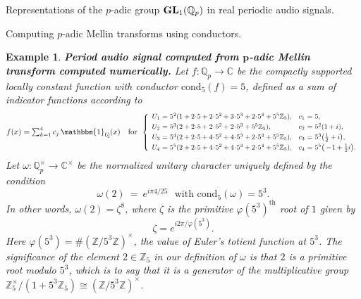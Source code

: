 \documentclass[letterpaper,11pt, reqno]{amsart}
\newtheorem{monodromy theorem}{Monodromy Theorem}[subsection]
\newtheorem{wild conjecture}[theorem]{Wild Conjecture}
\newtheorem{research objectives}{Research objectives}[subsection]
\newtheorem{research question}[theorem]{Research questions}
\newtheorem{aside question}[theorem]{Aside question}
\newtheorem{example}[theorem]{Example}
\newtheorem{audio example}[theorem]{\loudspeaker[3] Example}
\newtheorem{blank remark}[theorem]{}
\newtheorem{terminology and comment}[theorem]{Terminology and comment}
\newtheorem{purity hypothesis}[theorem]{Purity hypothesis}
\newtheorem{corollary of the purity hypothesis}[theorem]{Corollary of the purity hypothesis}
\newcommand{\CC} {{\mathbb C}}
\newcommand{\QQ} {{\mathbb Q}}
\newcommand{\ZZ} {{\mathbb Z}}
\newcommand{\lra}{{\longrightarrow}}
\numberwithin{equation}{theorem}
\begin{document}
\begin{section}{Representations of the $p$-adic group $\bold{GL}_{1}(\mathbb{Q}_{p})$
in real periodic audio signals.}
\begin{subsection}{Computing $p$-adic Mellin transforms using conductors.}
\begin{example}
{\bf Period audio signal computed from $\pmb{p}$-adic Mellin transform computed numerically.}
\normalfont
	Let $f:\QQ_p\lra\CC$ be the compactly supported locally constant function with conductor $\text{cond}_5(f)=5$, defined as a sum of indicator functions according to
	\begin{equation}\label{equation: cslc f for Mellin 01}
	\scalebox{.9}{$
	f(x)=\sum^{4}_{k=1}c_{j}\ \!\mathbbm{1}_{U_{\!j}\!}(x)
	\ \ \ \text{for}\ \ 
	\scalebox{.9}{$
	\left\{
	\begin{array}{rclcrcl}
	U_1
	&\!\!\!\!=\!\!\!\!&
	5^{2}(1+2\!\cdot\!5+2\!\cdot\!5^{2}+3\!\cdot\!5^3+2\!\cdot\!5^4+5^5\ZZ_{5}),
	&
	\!\!\!\!\!\!
	&
	c_1
	&\!\!\!\!=\!\!\!\!&
	5,
	\\[3pt]
	U_2
	&\!\!\!\!=\!\!\!\!&
	5^{3}(2+2\!\cdot\!5+2\!\cdot\!5^{2}+2\!\cdot\!5^3+5^5\ZZ_{5}),
	&
	\!\!\!\!\!\!
	&
	c_2
	&\!\!\!\!=\!\!\!\!&
	5^{2}(1+i),
	\\[3pt]
	U_3
	&\!\!\!\!=\!\!\!\!&
	5^{4}(2+2\!\cdot\!5+4\!\cdot\!5^{2}+4\!\cdot\!5^3+2\!\cdot\!5^4+5^5\ZZ_{5}),
	&
	\!\!\!\!\!\!
	&
	c_3
	&\!\!\!\!=\!\!\!\!&
	5^{3}\big(\tfrac{1}{2}+i\big),
	\\[3pt]
	U_4
	&\!\!\!\!=\!\!\!\!&
	5^{5}(2+2\!\cdot\!5+4\!\cdot\!5^{2}+4\!\cdot\!5^3+2\!\cdot\!5^4+5^5\ZZ_{5}),
	&
	\!\!\!\!\!\!
	&
	c_4
	&\!\!\!\!=\!\!\!\!&
	5^{5}\big(-\!1+\tfrac{1}{2}i\big).
	\end{array}
	\right.
	$}
	$}
	\end{equation}
Let $\omega:\QQ^\times_p\lra\CC^\times$ be the normalized unitary character uniquely defined by the condition
	\begin{equation}\label{equation: norm un char for Mellin 00}
	\omega(2)\ =\ e^{i\pi 4/25}
	\ \ \ \text{with cond}_5(\omega)=5^3.
	\end{equation}
In other words, $\omega(2)=\zeta^{8}$, where $\zeta$ is the primitive $\varphi(5^3)^\text{th}$ root of $1$ given by
	$$
	\zeta=e^{i2\pi/\varphi(5^3)}.
	$$
Here $\varphi(5^3)=\#(\ZZ/5^3\ZZ)^\times$, the value of Euler's totient function at $5^3$. The significance of the element $2\in\ZZ_5$ in our definition of $\omega$ is that $2$ is a primitive root modulo $5^3$, which is to say that it is a generator of the multiplicative group $\ZZ^{\times}_5/(1+5^3\ZZ_5)\cong(\ZZ/5^3\ZZ)^\times$.


\end{example}
\end{subsection}
\end{section}
\end{document}
